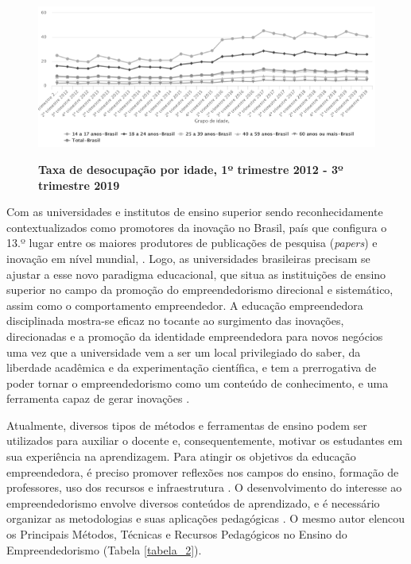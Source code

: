 \begin{figure}[!htb]
\centering
\caption{\textbf{Taxa de desocupação por idade, 1º trimestre 2012 - 3º trimestre 2019}}
\includegraphics[scale=0.25]{Imagens/taxa_desocupacao.png}
\label{figura_2}
\end{figure}
\newpage

Com as universidades e institutos de ensino superior sendo reconhecidamente contextualizados como promotores da inovação no Brasil, país que configura o 13.º lugar entre os maiores produtores de publicações de pesquisa (\textit{papers}) e inovação em nível mundial, . 
Logo, as universidades brasileiras precisam se ajustar a esse novo paradigma educacional, que situa as instituições de ensino superior no campo da promoção do empreendedorismo direcional e sistemático, assim como o comportamento empreendedor. A educação empreendedora disciplinada mostra-se eficaz no tocante ao surgimento das inovações, direcionadas e a promoção da identidade empreendedora para novos negócios \cite{jain_academics_2009} uma vez que a universidade vem a ser um local privilegiado do saber, da liberdade acadêmica e da experimentação científica, e tem a prerrogativa de poder tornar o empreendedorismo como um conteúdo de conhecimento, e uma ferramenta capaz de gerar inovações \cite{dolabela_oficina_2008}. 


Atualmente, diversos tipos de métodos e ferramentas de ensino podem ser utilizados para auxiliar o docente e, consequentemente, motivar os estudantes em sua experiência na aprendizagem. Para atingir os objetivos da educação empreendedora, é preciso promover reflexões nos campos do ensino, formação de professores, uso dos recursos e infraestrutura \cite{marques_experiencia_2019}. O desenvolvimento do interesse ao empreendedorismo envolve diversos conteúdos de aprendizado, e é necessário organizar as metodologias e suas aplicações pedagógicas \cite{rocha_avaliacao_2014}. O mesmo autor elencou os Principais Métodos, Técnicas e Recursos Pedagógicos no Ensino do Empreendedorismo (Tabela \ref{tabela_2}). 




